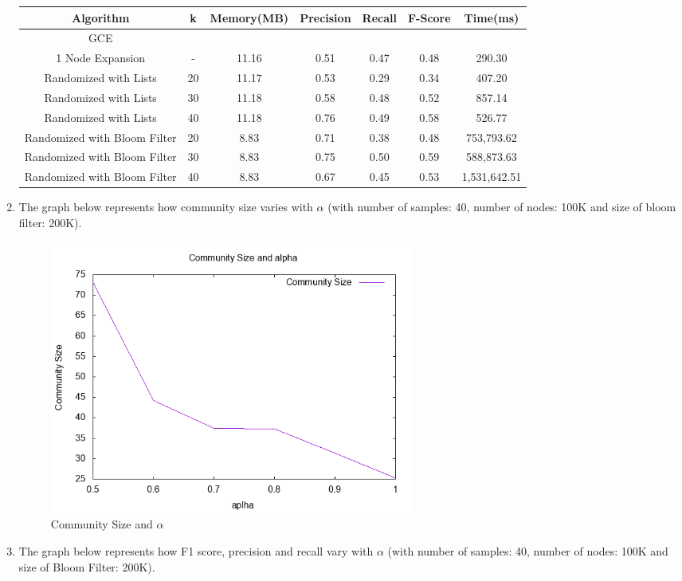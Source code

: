\documentclass[a4paper]{article}
\begin{document}
\begin{enumerate}
\begin{center}
 \begin{tabular}{||c c c c c c c||} 
 \hline
 Algorithm & k & Memory(MB) & Precision & Recall & F-Score & Time(ms)\\ [0.4ex] 
 \hline\hline
 GCE &   &  &  &  &  & \\ 
 \hline
 1 Node Expansion & - & 11.16 &0.51 & 0.47 & 0.48 & 290.30\\
 \hline
 Randomized with Lists & 20 & 11.17 & 0.53 & 0.29 & 0.34 & 407.20\\
 \hline
 Randomized with Lists & 30 & 11.18 & 0.58 & 0.48 & 0.52 & 857.14\\
 \hline
 Randomized with Lists & 40 & 11.18 & 0.76 & 0.49 & 0.58 & 526.77\\  
 \hline
 Randomized with Bloom Filter & 20 & 8.83 & 0.71 & 0.38 & 0.48 & 753,793.62\\  
 \hline
 Randomized with Bloom Filter & 30 & 8.83 & 0.75 & 0.50 & 0.59 & 588,873.63\\  
 \hline
 Randomized with Bloom Filter & 40 & 8.83 & 0.67 & 0.45 & 0.53 & 1,531,642.51\\  
 \hline
\end{tabular}
\end{center}

\item 
The graph below represents how community size varies with $\alpha$ (with number of samples: 40, number of nodes: 100K and size of bloom filter: 200K).

\begin{figure}[h!] 
\centering
\includegraphics[width=0.6\textwidth]{Community Size.png}
\caption{\label{fig:Community Size and $\alpha$}Community Size and $\alpha$}
\end{figure}


\item 
The graph below represents how F1 score, precision and recall vary with $\alpha$ (with number of samples: 40, number of nodes: 100K and size of Bloom Filter: 200K).


\end{enumerate}
\end{document}
